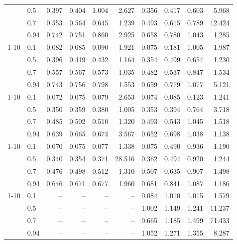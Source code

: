\begin{tabular}{l|l|rrrr|rrrr}
 & 0.5 & 0.397 & 0.404 & 1.004 & 2.627 & 0.356 & 0.417 & 0.603 & 5.968 \\
 & 0.7 & 0.553 & 0.564 & 0.645 & 1.239 & 0.493 & 0.615 & 0.789 & 12.424 \\
 & 0.94 & 0.742 & 0.751 & 0.860 & 2.925 & 0.658 & 0.780 & 1.043 & 1.285 \\
\cmidrule{1-10}
\multirow[t]{4}{*}{IRQ steering removed} & 0.1 & 0.082 & 0.085 & 0.090 & 1.921 & 0.075 & 0.181 & 1.005 & 1.987 \\
 & 0.5 & 0.396 & 0.419 & 0.432 & 1.164 & 0.354 & 0.499 & 0.654 & 1.230 \\
 & 0.7 & 0.557 & 0.567 & 0.573 & 1.035 & 0.482 & 0.537 & 0.847 & 1.534 \\
 & 0.94 & 0.743 & 0.756 & 0.798 & 1.553 & 0.659 & 0.779 & 1.077 & 5.121 \\
\cmidrule{1-10}
\multirow[t]{4}{*}{boot-params bundle removed} & 0.1 & 0.072 & 0.075 & 0.079 & 2.653 & 0.074 & 0.085 & 0.123 & 1.241 \\
 & 0.5 & 0.350 & 0.359 & 0.380 & 1.005 & 0.353 & 0.394 & 0.764 & 3.718 \\
 & 0.7 & 0.485 & 0.502 & 0.510 & 1.320 & 0.493 & 0.543 & 1.045 & 1.518 \\
 & 0.94 & 0.639 & 0.665 & 0.674 & 3.567 & 0.652 & 0.698 & 1.038 & 1.138 \\
\cmidrule{1-10}
\multirow[t]{4}{*}{frequency pinning removed} & 0.1 & 0.070 & 0.075 & 0.077 & 1.338 & 0.075 & 0.490 & 0.936 & 1.190 \\
 & 0.5 & 0.340 & 0.354 & 0.371 & 28.516 & 0.362 & 0.494 & 0.920 & 1.244 \\
 & 0.7 & 0.476 & 0.498 & 0.512 & 1.310 & 0.507 & 0.635 & 0.907 & 1.498 \\
 & 0.94 & 0.646 & 0.671 & 0.677 & 1.960 & 0.681 & 0.841 & 1.087 & 1.186 \\
\cmidrule{1-10}
\multirow[t]{4}{*}{SMT enabled (multi-core)} & 0.1 & -- & -- & -- & -- & 0.084 & 1.010 & 1.015 & 1.579 \\
 & 0.5 & -- & -- & -- & -- & 1.002 & 1.149 & 1.241 & 11.237 \\
 & 0.7 & -- & -- & -- & -- & 0.665 & 1.185 & 1.499 & 71.433 \\
 & 0.94 & -- & -- & -- & -- & 1.052 & 1.271 & 1.355 & 8.287 \\
\bottomrule
\end{tabular}
